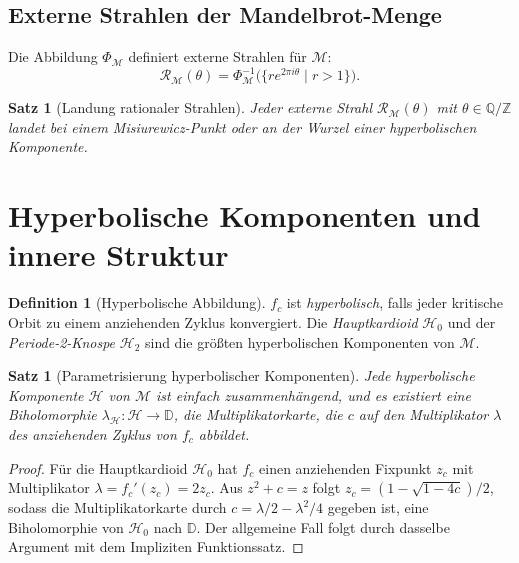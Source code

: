 \documentclass[12pt,a4paper]{amsart}
\newtheorem{satz}[theorem]{Satz}
\theoremstyle{definition}
\newtheorem{definition_de}[theorem]{Definition}
\theoremstyle{remark}
\begin{document}
\subsection{Externe Strahlen der Mandelbrot-Menge}

Die Abbildung $\Phi_{\mathcal{M}}$ definiert externe Strahlen für $\mathcal{M}$:
\[
    \mathcal{R}_{\mathcal{M}}(\theta) = \Phi_{\mathcal{M}}^{-1}\bigl(\{ r e^{2\pi i \theta} \mid r > 1 \}\bigr).
\]

\begin{satz}[Landung rationaler Strahlen]
Jeder externe Strahl $\mathcal{R}_{\mathcal{M}}(\theta)$ mit
$\theta \in \mathbb{Q}/\mathbb{Z}$ landet bei einem Misiurewicz-Punkt
oder an der Wurzel einer hyperbolischen Komponente.
\end{satz}

\section{Hyperbolische Komponenten und innere Struktur}

\begin{definition_de}[Hyperbolische Abbildung]
$f_c$ ist \emph{hyperbolisch}, falls jeder kritische Orbit zu einem
anziehenden Zyklus konvergiert. Die \emph{Hauptkardioid} $\mathcal{H}_0$
und der \emph{Periode-2-Knospe} $\mathcal{H}_2$ sind die größten
hyperbolischen Komponenten von $\mathcal{M}$.
\end{definition_de}

\begin{satz}[Parametrisierung hyperbolischer Komponenten]
Jede hyperbolische Komponente $\mathcal{H}$ von $\mathcal{M}$ ist einfach
zusammenhängend, und es existiert eine Biholomorphie
$\lambda_{\mathcal{H}} \colon \mathcal{H} \to \mathbb{D}$,
die \emph{Multiplikatorkarte}, die $c$ auf den Multiplikator $\lambda$
des anziehenden Zyklus von $f_c$ abbildet.
\end{satz}

\begin{proof}
Für die Hauptkardioid $\mathcal{H}_0$ hat $f_c$ einen anziehenden Fixpunkt
$z_c$ mit Multiplikator $\lambda = f_c'(z_c) = 2z_c$. Aus $z^2+c=z$ folgt
$z_c = (1 - \sqrt{1-4c})/2$, sodass die Multiplikatorkarte durch
$c = \lambda/2 - \lambda^2/4$ gegeben ist, eine Biholomorphie von
$\mathcal{H}_0$ nach $\mathbb{D}$. Der allgemeine Fall folgt durch dasselbe
Argument mit dem Impliziten Funktionssatz.
\end{proof}
\end{document}
